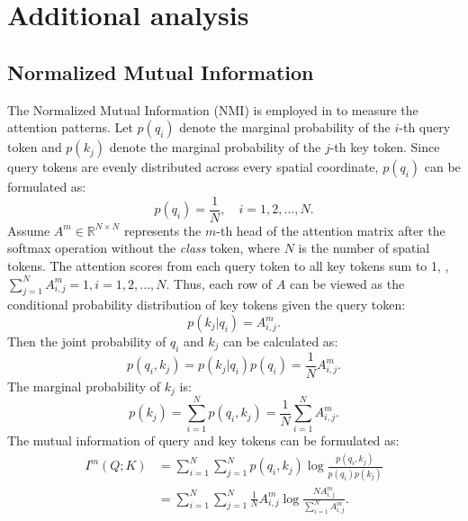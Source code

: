 \section{Additional analysis}
\label{app:appendix_analysis}

\subsection{Normalized Mutual Information}
\label{app:NMI}
The Normalized Mutual Information (NMI) is employed in  to measure the attention patterns. Let $p(q_i)$ denote the marginal probability of the $i$-th query token and $p(k_j)$ denote the marginal probability of the $j$-th key token. Since query tokens are evenly distributed across every spatial coordinate, $p(q_i)$ can be formulated as:
\begin{equation}
    p(q_i)=\frac{1}{N}, \quad i=1,2,...,N.
    \label{eq:marginal_q}
\end{equation}
Assume $A^m\in \mathbb{R}^{N\times N}$ represents the $m$-th head of the attention matrix after the softmax operation without the \textit{class} token, where $N$ is the number of spatial tokens. The attention scores from each query token to all key tokens sum to 1, \ie, $\sum_{j=1}^N A_{i,j}^m=1, i=1,2,...,N. $
Thus, each row of $A$ can be viewed as the conditional probability distribution of key tokens given the query token:
\begin{equation}
    p(k_j\vert q_i)=A_{i,j}^m.
\end{equation}
Then the joint probability of $q_i$ and $k_j$ can be calculated as:
\begin{equation}
    p(q_i,k_j)=p(k_j\vert q_i)p(q_i)=\frac{1}{N}A_{i,j}^m.
    \label{eq:joint_qk}
\end{equation}
The marginal probability of $k_j$ is:
\begin{equation}
    p(k_j)=\sum_{i=1}^Np(q_i,k_j)=\frac{1}{N}\sum_{i=1}^NA_{i,j}^m.
    \label{eq:marginal_k}
\end{equation}
The mutual information of query and key tokens can be formulated as:
\begin{equation}
\begin{aligned}
    I^m(Q;K)&=\sum_{i=1}^N\sum_{j=1}^Np(q_i,k_j)\log{\frac{p(q_i,k_j)}{p(q_i)p(k_j)}} \\
    &=\sum_{i=1}^N\sum_{j=1}^N\frac{1}{N}A_{i,j}^m\log{\frac{NA_{i,j}^m}{\sum_{i=1}^NA_{i,j}^m}}.
\end{aligned}
\end{equation}
